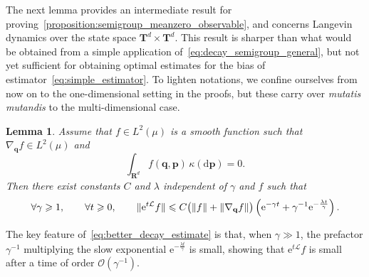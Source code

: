 \documentclass[11pt,a4paper]{article}
\newcommand{\e}{\mathrm{e}}
\newcommand{\real}{\mathbf R}
\newcommand{\torus}{\mathbf T}
\newcommand{\grad}{\nabla}
\newcommand{\vect}[1]{\boldsymbol{\mathbf #1}}
\renewcommand{\d}{\mathrm d}
\theoremstyle{plain}
\newtheorem{lemma}[theorem]{Lemma}
\numberwithin{equation}{section}
\renewcommand{\leq}{\leqslant}
\renewcommand{\geq}{\geqslant}
\begin{document}

The next lemma provides an intermediate result for proving~\cref{proposition:semigroup_meanzero_observable},
and concerns Langevin dynamics over the state space $\torus^d \times \torus^d$.
This result is sharper than what would be obtained from a simple application of~\eqref{eq:decay_semigroup_general},
but not yet sufficient for obtaining optimal estimates for the bias of estimator~\eqref{eq:simple_estimator}.
To lighten notations,
we confine ourselves from now on to the one-dimensional setting in the proofs,
but these carry over \emph{mutatis mutandis} to the multi-dimensional case.
\begin{lemma}
    \label{lemma:initial_lemma}
    Assume that $f \in L^2(\mu)$ is a smooth function such that $\grad_{\vect q} f \in L^2(\mu)$ and
    \begin{equation}
        \label{eq:assumption_f}
        \int_{\real^d} f(\vect q, \vect p) \, \kappa(\d \vect p) = 0.
    \end{equation}
    Then there exist constants $C$ and $\lambda$ independent of $\gamma$ and $f$ such that
    \begin{align}
        \label{eq:better_decay_estimate}
        \forall \gamma \geq 1, \qquad
        \forall t \geq 0, \qquad
        \norm*{\e^{t\mathcal L} f}
        \leq C \bigl( \norm{f} + \norm{\grad_{\vect q} f} \bigr)
        \left( \e^{- \gamma t} + \gamma^{-1} \e^{-\frac{\lambda t}{\gamma}} \right).
    \end{align}
\end{lemma}
The key feature of~\eqref{eq:better_decay_estimate} is that,
when $\gamma \gg 1$,
the prefactor $\gamma^{-1}$ multiplying the slow exponential $\e^{-\frac{\lambda t}{\gamma}}$ is small,
showing that $\e^{t\mathcal L} f$ is small after a time of order $\mathcal O(\gamma^{-1})$.
\end{document}
